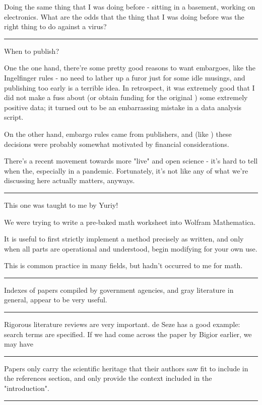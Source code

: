 \documentclass[paper.tex]{subfiles}
\begin{document}
Doing the same thing that I was doing before - sitting in a basement, working on electronics. What are the odds that the thing that I was doing before was the right thing to do against a virus?

\rule{\linewidth}{0.2pt}

When to publish?

One the one hand, there're some pretty good reasons to want embargoes, like the Ingelfinger rules - no need to lather up a furor just for some idle musings, and publishing too early is a terrible idea. In retrospect, it was extremely good that I did not make a fuss about (or obtain funding for the original ) some extremely positive data; it turned out to be an embarrassing mistake in a data analysis script.

On the other hand, embargo rules came from publishers, and (like ) these decisions were probably somewhat motivated by financial considerations.

There's a recent movement towards more "live" and open science - it's hard to tell when the, especially in a pandemic. Fortunately, it's not like any of what we're discussing here actually matters, anyways.

\rule{\linewidth}{0.2pt}

This one was taught to me by Yuriy!

We were trying to write a pre-baked math worksheet into Wolfram Mathematica.

It is useful to first strictly implement a method precisely as written, and only when all parts are operational and understood, begin modifying for your own use.

This is common practice in many fields, but hadn't occurred to me for math. 

\rule{\linewidth}{0.2pt}

Indexes of papers compiled by government agencies, and gray literature in general, appear to be very useful.

\rule{\linewidth}{0.2pt}

Rigorous literature reviews are very important. de Seze has a good example: search terms are specified. If we had come across the paper by Bigior earlier, we may have

\rule{\linewidth}{0.2pt}

Papers only carry the scientific heritage that their authors saw fit to include in the references section, and only provide the context included in the "introduction". 

\rule{\linewidth}{0.2pt}
\end{document}
